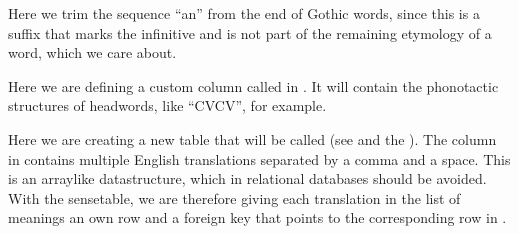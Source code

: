 \documentclass[letterpaper,10pt,english]{sphinxmanual}
\begin{document}
\sphinxAtStartPar
Here we trim the sequence “an” from the end of Gothic words, since this
is a suffix that marks the infinitive and is not part of the remaining
etymology of a word, which we care about.

\begin{sphinxVerbatim}[commandchars=\\\{\}]
 
      
\end{sphinxVerbatim}

\sphinxAtStartPar
Here we are defining a custom column called  in
. It will contain the phonotactic structures of
headwords, like “CVCV”, for example.

\begin{sphinxVerbatim}[commandchars=\\\{\}]
       
       
\end{sphinxVerbatim}

\sphinxAtStartPar
Here we are creating a new table that will be called  (see
and the ).
The column  in  contains multiple
English translations separated by a comma and a space. This is an
array\sphinxhyphen{}like data\sphinxhyphen{}structure,
which in relational databases should be avoided. With the sense\sphinxhyphen{}table,
we are therefore giving each translation in the list of meanings an own row
and a foreign key that points to the corresponding row in .
\end{document}

